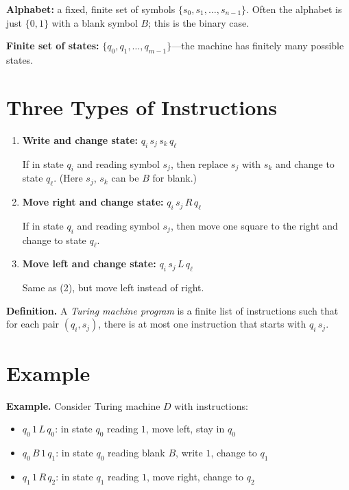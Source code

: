 \documentclass[11pt]{article}
\begin{document}
\textbf{Alphabet:} a fixed, finite set of symbols $\{s_0, s_1, \ldots, s_{n-1}\}$. Often the alphabet is just $\{0, 1\}$ with a blank symbol $B$; this is the binary case.

\textbf{Finite set of states:} $\{q_0, q_1, \ldots, q_{m-1}\}$---the machine has finitely many possible states.

\section{Three Types of Instructions}

\begin{enumerate}[leftmargin=1.8em, label=\arabic*)]
    \item \textbf{Write and change state:} $q_i \, s_j \, s_k \, q_\ell$

    If in state $q_i$ and reading symbol $s_j$, then replace $s_j$ with $s_k$ and change to state $q_\ell$. (Here $s_j$, $s_k$ can be $B$ for blank.)

    \item \textbf{Move right and change state:} $q_i \, s_j \, R \, q_\ell$

    If in state $q_i$ and reading symbol $s_j$, then move one square to the right and change to state $q_\ell$.

    \item \textbf{Move left and change state:} $q_i \, s_j \, L \, q_\ell$

    Same as (2), but move left instead of right.
\end{enumerate}

\textbf{Definition.} A \emph{Turing machine program} is a finite list of instructions such that for each pair $(q_i, s_j)$, there is at most one instruction that starts with $q_i \, s_j$.

\section{Example}

\textbf{Example.} Consider Turing machine $D$ with instructions:
\begin{itemize}[leftmargin=1.6em]
    \item $q_0 \, 1 \, L \, q_0$: in state $q_0$ reading $1$, move left, stay in $q_0$
    \item $q_0 \, B \, 1 \, q_1$: in state $q_0$ reading blank $B$, write $1$, change to $q_1$
    \item $q_1 \, 1 \, R \, q_2$: in state $q_1$ reading $1$, move right, change to $q_2$
\end{itemize}
\end{document}
